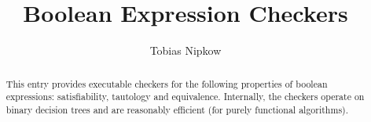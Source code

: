 \documentclass[11pt,a4paper]{article}
\begin{document}
\title{Boolean Expression Checkers}
\author{Tobias Nipkow}
\maketitle

\begin{abstract}
This entry provides executable checkers for the following properties of
boolean expressions: satisfiability, tautology and equivalence. Internally,
the checkers operate on binary decision trees and are reasonably efficient
(for purely functional algorithms).
\end{abstract}

\tableofcontents


\end{document}
